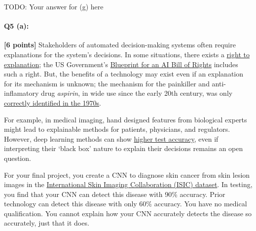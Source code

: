\begin{enumerate}[(a)]
    \begin{tcolorbox}[colback=white!5!white,colframe=green!75!black]
    
    TODO: Your answer for (g) here 
    
    \end{tcolorbox}

\end{enumerate}


\pagebreak

\paragraph{Q5 (a):} \textbf{[6 points]} Stakeholders of automated decision-making systems often require explanations for the system's decisions. In some situations, there exists a \href{https://en.wikipedia.org/wiki/Right_to_explanation}{right to explanation}; the US Government's \href{https://www.whitehouse.gov/ostp/ai-bill-of-rights/}{Blueprint for an AI Bill of Rights} includes such a right. But, the benefits of a technology may exist even if an explanation for its mechanism is unknown; the mechanism for the painkiller and anti-inflamatory drug \emph{aspirin}, in wide use since the early 20th century, was only \href{https://en.wikipedia.org/wiki/History_of_aspirin#Investigating_how_aspirin_works}{correctly identified in the 1970s}.

For example, in medical imaging, hand designed features from biological experts might lead to explainable methods for patients, physicians, and regulators. However, deep learning methods can show \href{https://drive.google.com/file/d/1bDAqEtW482OJeqMBt5A4AradVa4gf_o9/view}{higher test accuracy}, even if interpreting their `black box' nature to explain their decisions remains an open question.

For your final project, you create a CNN to diagnose skin cancer from skin lesion images in the \href{https://challenge2020.isic-archive.com/}{International Skin Imaging Collaboration (ISIC) dataset}. In testing, you find that your CNN can detect this disease with 90\% accuracy. Prior technology can detect this disease with only 60\% accuracy. You have no medical qualification. You cannot explain how your CNN accurately detects the disease so accurately, just that it does.

